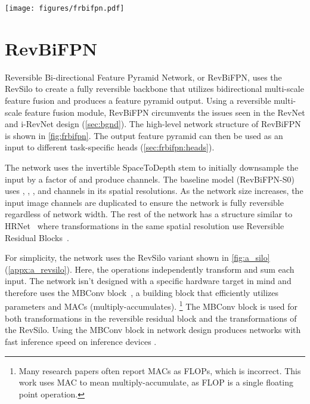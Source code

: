 \documentclass{article}
\begin{document}
\begin{figure*}
    \centering
    \texttt{[image: figures/frbifpn.pdf]}
    \vskip -10pt
    \caption{
        \textbf{A RevBiFPN that creates an  feature pyramid}.
        Given the output feature pyramid, all activations can be recomputed going backward through the network. 
        The  components are reversible residual blocks.
        The network builds an  multi-scale hidden representation using 3 RevSilos and has an extra depth of  RevSilos for further feature fusion.
    }
    \label{fig:frbifpn}
    \vskip -5pt
\end{figure*}

\section{RevBiFPN}
\label{sec:frbifpn}

Reversible Bi-directional Feature Pyramid Network, or RevBiFPN, uses the RevSilo to create a fully reversible backbone that utilizes bidirectional multi-scale feature fusion and produces a feature pyramid output.
Using a reversible multi-scale feature fusion module, RevBiFPN circumvents the issues seen in the RevNet and i-RevNet design (\cref{sec:bgnd}).
The high-level network structure of RevBiFPN is shown in \cref{fig:frbifpn}.
The output feature pyramid can then be used as an input to different task-specific heads (\cref{sec:frbifpn:heads}).

The network uses the invertible SpaceToDepth stem \cite{ridnik2020tresnet, shi2016real, dinh2016density, jacobsen2018irevnet} to initially downsample the input by a factor of  and produce  channels.
The baseline model (RevBiFPN-S0) uses , , , and  channels in its  spatial resolutions.
As the network size increases, the input image channels are duplicated to ensure the network is fully reversible regardless of network width.
The rest of the network has a structure similar to HRNet~\cite{sun2019hrnet_pose} where transformations in the same spatial resolution use Reversible Residual Blocks~\cite{gomez2017reversible}. 

For simplicity, the network uses the RevSilo variant shown in \cref{fig:a_silo} (\cref{appx:a_revsilo}).
Here, the  operations independently transform and sum each input.
The network isn't designed with a specific hardware target in mind and therefore uses the MBConv block~\cite{howard2017mobilenets}, a building block that efficiently utilizes parameters and MACs (multiply-accumulates).
\footnote{Many research papers often report MACs as FLOPs, which is incorrect. This work uses MAC to mean multiply-accumulate, as FLOP is a single floating point operation.}
The MBConv block is used for both transformations in the reversible residual block and the  transformations of the RevSilo.
Using the MBConv block in network design produces networks with fast inference speed on inference devices \cite{howard2017mobilenets, sandler2018mobilenetv2, howard2019searchingmbconv, tan2019efficientnet,  mehta2021mobilevit}.
\end{document}
